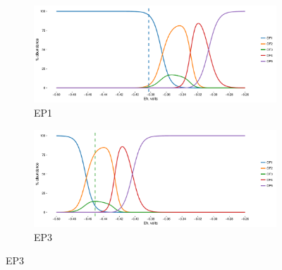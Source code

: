 \begin{figure}[h]
\centering

    \begin{subfigure}[b]{\linewidth}
       	\includegraphics[width=1\linewidth]{"figs_app2/Empress OF1_thermo"}
       	\caption{EP1}
        \label{fig:EP1_thermo}
    \end{subfigure}
    \begin{subfigure}[b]{\linewidth}
    	\includegraphics[width=1\linewidth]{"figs_app2/Empress OF3_thermo"}
    	\caption{EP3}
        \label{fig:EP3_thermo}
    \end{subfigure}
    
\end{figure}

\newpage

